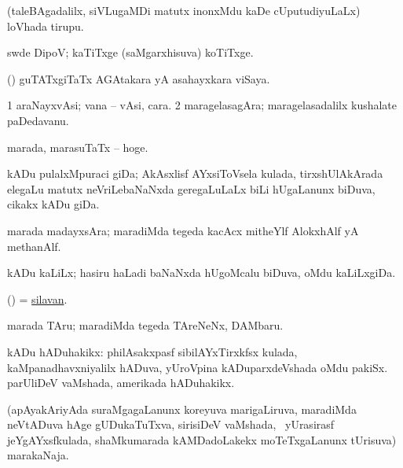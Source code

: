 \bentry
{} 
\gl{\nA}
\bmng
(taleBAgadalilx, siVLugaMDi matutx inonxMdu kaDe cUputudiyuLaLx) loVhada tirupu. 
\emng
\eentry

\bentry
{} 
\gl{\nA}
\expl{}
\bmng
swde DipoV; kaTiTxge (saMgarxhisuva) koTiTxge. 
\emng

\noindent
\gl{\pagu}
\expl{}
\bmng
{} (\AmA) guTATxgiTaTx AGAtakara yA asahayxkara viSaya. 
\emng
\eentry

\bentry
{} 
\gl{\nA}
\bmng
\bnum
\num{1} araNayxvAsi; vana -- vAsi, cara. 
\num{2} maragelasagAra; maragelasadalilx kushalate paDedavanu. 
\enum
\emng
\eentry

\bentry 
{} 
\gl{\nA}
\expl{}
\bmng
marada, marasuTaTx -- hoge. 
\emng
\eentry

\bentry
{} 
\gl{\nA}
\expl{}
\bmng
kADu pulalxMpuraci giDa; AkAsxlisf AYxsiToVsela kulada, tirxshUlAkArada elegaLu matutx neVriLebaNaNxda geregaLuLaLx biLi hUgaLanunx biDuva, cikakx kADu giDa. 
\emng
\eentry

\bentry
{} 
\gl{\nA}
\expl{}
\bmng
marada madayxsAra; maradiMda tegeda kacAcx mitheYlf AlokxhAlf yA methanAlf. 
\emng
\eentry

\bentry
{} 
\gl{\nA}
\expl{}
\bmng
kADu kaLiLx; hasiru haLadi baNaNxda hUgoMcalu biDuva, oMdu kaLiLxgiDa. 
\emng
\eentry

\bentry
{} 
\gl{\gu}
\expl{}
\bmng
(\ame) = \hyperref{kandict_s.pdf}{S}{silavan}{silavan}. 
\emng
\eentry

\bentry 
{} 
\gl{\nA}
\expl{}
\bmng
marada TAru; maradiMda tegeda TAreNeNx, DAMbaru. 
\emng
\eentry

\bentry
{} 
\gl{\nA}
\expl{}
\bmng
kADu hADuhakikx: 
\banum
{} philAsakxpasf sibilAYxTirxkfsx kulada, kaMpanadhavxniyalilx hADuva, yUroVpina kADuparxdeVshada oMdu pakiSx. 
 parUliDeV vaMshada, amerikada hADuhakikx. 
\eanum
\emng
\eentry

\bentry
{} 
\gl{\nA}
\expl{}
\bmng
(apAyakAriyAda suraMgagaLanunx koreyuva marigaLiruva, maradiMda neVtADuva hAge gUDukaTuTxva, sirisiDeV vaMshada, \kanmu\ yUrasirasf jeYgAYxsfkulada, shaMkumarada kAMDadoLakekx moTeTxgaLanunx tUrisuva) marakaNaja. 
\emng
\eentry

